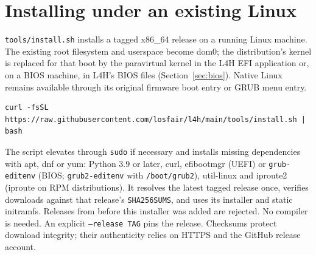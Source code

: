 \documentclass[11pt,a4paper]{report}
\newcommand{\cmd}[1]{\texttt{#1}}
\newcommand{\file}[1]{\texttt{#1}}
\begin{document}
\section{Installing under an existing Linux}

\file{tools/install.sh} installs a tagged x86\_64 release on a running
Linux machine. The existing root filesystem and userspace become dom0;
the distribution's kernel is replaced for that boot by the paravirtual
kernel in the L4H EFI application or, on a BIOS machine, in L4H's BIOS
files (Section~\ref{sec:bios}). Native Linux remains available through
its original firmware boot entry or GRUB menu entry.

\begin{lstlisting}
curl -fsSL https://raw.githubusercontent.com/losfair/l4h/main/tools/install.sh | bash
\end{lstlisting}

The script elevates through \cmd{sudo} if necessary and installs missing
dependencies with apt, dnf or yum: Python 3.9 or later, curl, efibootmgr
(UEFI) or \cmd{grub-editenv} (BIOS; \cmd{grub2-editenv} with
\file{/boot/grub2}), util-linux and iproute2 (iproute on RPM
distributions). It resolves the
latest tagged release once, verifies downloads against that release's
\file{SHA256SUMS}, and uses its installer and static initramfs. Releases
from before this installer was added are rejected. No compiler is needed.
An explicit \texttt{--release TAG} pins the release. Checksums protect
download integrity; their authenticity relies on HTTPS and the GitHub
release account.
\end{document}
